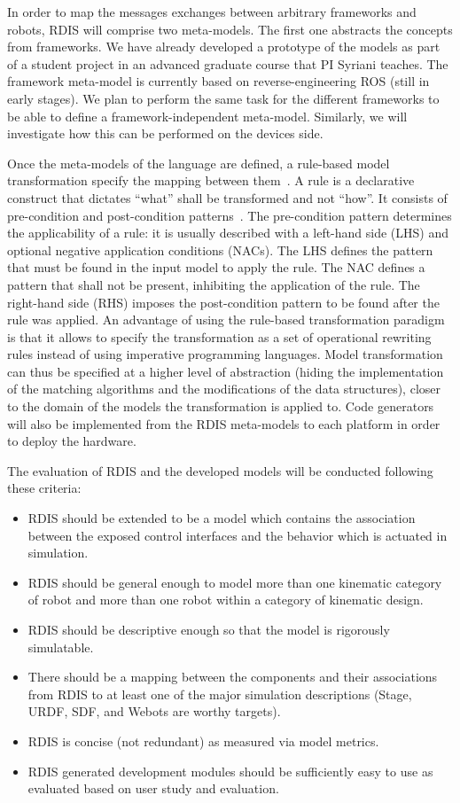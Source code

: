 In order to map the messages exchanges between arbitrary frameworks and robots, RDIS will comprise two meta-models.
The first one abstracts the concepts from frameworks.
We have already developed a prototype of the models as part of a student project in an advanced graduate course that PI Syriani teaches.
The framework meta-model is currently based on reverse-engineering ROS (still in early stages).
We plan to perform the same task for the different frameworks to be able to define a framework-independent meta-model.
Similarly, we will investigate how this can be performed on the devices side.

Once the meta-models of the language are defined, a rule-based model transformation specify the mapping between them~\cite{Jouault2008}.
A rule is a declarative construct that dictates ``what'' shall be transformed and not ``how''.
It consists of pre-condition and post-condition patterns~\cite{Ehrig2006}.
The pre-condition pattern determines the applicability of a rule: it is usually described with a left-hand side (LHS) and optional negative application conditions (NACs).
The LHS defines the pattern that must be found in the input model to apply the rule.
The NAC defines a pattern that shall not be present, inhibiting the application of the rule.
The right-hand side (RHS) imposes the post-condition pattern to be found after the rule was applied.
An advantage of using the rule-based transformation paradigm is that it allows to specify the transformation as a set of operational rewriting rules instead of using imperative programming languages.
Model transformation can thus be specified at a higher level of abstraction (hiding the implementation of the matching algorithms and the modifications of the data structures), closer to the domain of the models the transformation is applied to.
Code generators will also be implemented from the RDIS meta-models to each platform in order to deploy the hardware.

The evaluation of RDIS and the developed models will be conducted following these criteria:
\vspace{-.5\baselineskip}%
\begin{itemize}
  \item RDIS should be extended to be a model which contains the association between the exposed control interfaces and the behavior which is actuated in
  simulation.
  \item RDIS should be general enough to model more than one kinematic category of robot and more than one robot within a category of kinematic design.
  \item RDIS should be descriptive enough so that the model is rigorously simulatable.
  \item There should be a mapping between the components and their associations from RDIS to at least one of the major simulation descriptions (Stage, URDF, SDF, and Webots are worthy targets).
  \item RDIS is concise (not redundant) as measured via model metrics.
  \item RDIS generated development modules should be sufficiently easy to use as evaluated based on user study and evaluation.
\end{itemize}

